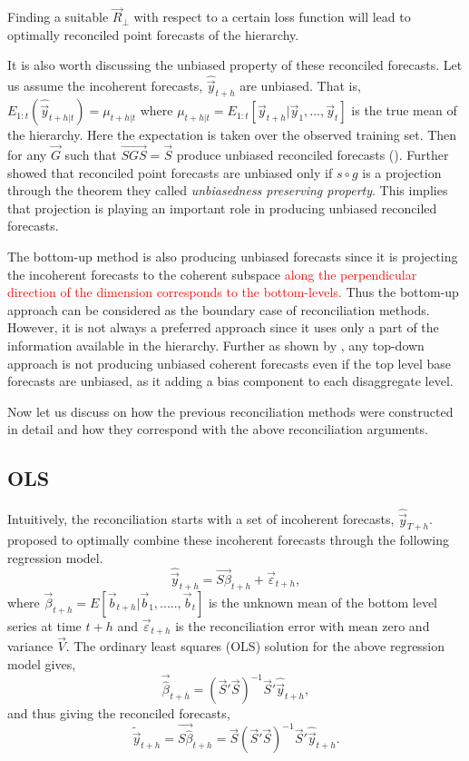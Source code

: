 \documentclass[graybox]{svmult}
\begin{document}
Finding a suitable $\vec{R}_\bot$ with respect to a certain loss function will lead to optimally reconciled point forecasts of the hierarchy. 

It is also worth discussing the unbiased property of these reconciled forecasts. Let us assume the incoherent forecasts, $\hat{\vec{y}}_{t+h}$ are unbiased. That is, $E_{1:t}(\hat{\vec{y}}_{t+h|t})=\mu_{t+h|t}$ where $\mu_{t+h|t} = E_{1:t}[\vec{y}_{t+h}|\vec{y}_1,...,\vec{y}_t]$ is the true mean of the hierarchy. Here the expectation is taken over the observed training set. Then for any $\vec{G}$ such that $\vec{SGS}=\vec{S}$ produce unbiased reconciled forecasts (\cite{hyndman2011}). Further \cite{Gamakumara2018} showed that reconciled point forecasts are unbiased only if $s\circ g$ is a projection through the theorem they called \textit{unbiasedness preserving property}. This implies that projection is playing an important role in producing unbiased reconciled forecasts.    

The bottom-up method is also producing unbiased forecasts since it is projecting the incoherent forecasts to the coherent subspace \textcolor{red}{along the perpendicular direction of the dimension corresponds to the bottom-levels. } Thus the bottom-up approach can be considered as the boundary case of reconciliation methods. However, it is not always a preferred approach since it uses only a part of the information available in the hierarchy. Further as shown by \cite{hyndman2011}, any top-down approach is not producing unbiased coherent forecasts even if the top level base forecasts are unbiased, as it adding a bias component to each disaggregate level. 

Now let us discuss on how the previous reconciliation methods were constructed in detail and how they correspond with the above reconciliation arguments. 


\subsection{OLS}

Intuitively, the reconciliation starts with a set of incoherent forecasts, $\hat{\vec{y}}_{T+h}$. \cite{hyndman2011} proposed to optimally combine these incoherent forecasts through the following regression model.  
\begin{equation} \label{eq:20}
\hat{\vec{y}}_{t+h} = \vec{S\beta}_{t+h} + \vec{\varepsilon}_{t+h},
\end{equation}
where $\vec{\beta}_{t+h}=E[\vec{b}_{t+h}|\vec{b}_1,.....,\vec{b}_t]$ is the unknown mean of the bottom level series at time $t+h$ and $\vec{\varepsilon}_{t+h}$ is the reconciliation error with mean zero and variance $\vec{V}$. The ordinary least squares (OLS) solution for the above regression model gives, 
\begin{equation} \label{eq:21}
\vec{\hat{\beta}}_{t+h} = (\vec{S}'\vec{S})^{-1}\vec{S}'\hat{\vec{y}}_{t+h},
\end{equation}
and thus giving the reconciled forecasts, 
\begin{equation} \label{eq:22}
\tilde{\vec{y}}_{t+h} = \vec{S\hat{\beta}}_{t+h} = \vec{S}(\vec{S}'\vec{S})^{-1}\vec{S}'\hat{\vec{y}}_{t+h}.
\end{equation}
\end{document}
